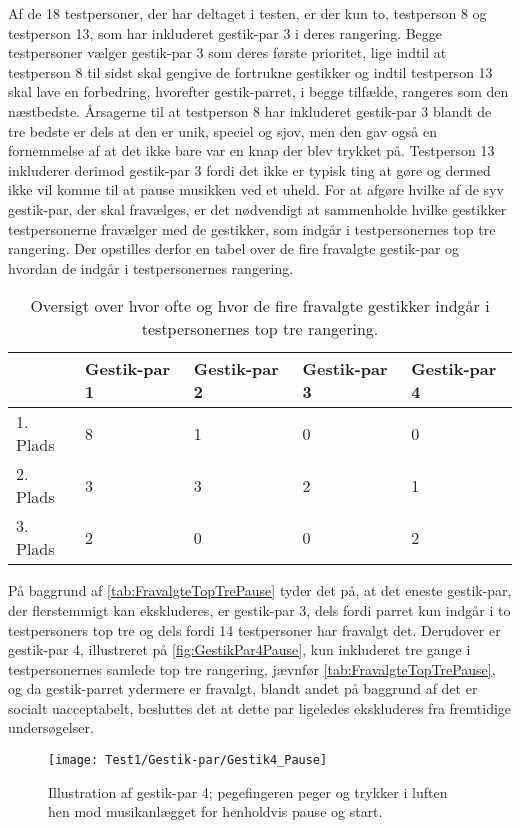 Af de 18 testpersoner, der har deltaget i testen, er der kun to, testperson 8 og testperson 13, som har inkluderet gestik-par 3 i deres rangering. Begge testpersoner vælger gestik-par 3 som deres første prioritet, lige indtil at testperson 8 til sidst skal gengive de fortrukne gestikker og indtil testperson 13 skal lave en forbedring, hvorefter gestik-parret, i begge tilfælde, rangeres som den næstbedste. Årsagerne til at testperson 8 har inkluderet gestik-par 3 blandt de tre bedste er dels at den er unik, speciel og sjov, men den gav også en fornemmelse af at det ikke bare var en knap der blev trykket på. Testperson 13 inkluderer derimod gestik-par 3 fordi det ikke er typisk ting at gøre og dermed ikke vil komme til at pause musikken ved et uheld.\blankline
%
For at afgøre hvilke af de syv gestik-par, der skal fravælges, er det nødvendigt at sammenholde hvilke gestikker testpersonerne fravælger med de gestikker, som indgår i testpersonernes top tre rangering. Der opstilles derfor en tabel over de fire fravalgte gestik-par og hvordan de indgår i testpersonernes rangering.
%
\begin{table}[H]
	\centering
	\begin{tabular}{ | p{2.4cm} | p{2.4cm} | p{2.4cm} | p{2.4cm} | p{2.4cm} |}
	\hline
		 & Gestik-par 1 & Gestik-par 2 & Gestik-par 3 & Gestik-par 4 \\ \hline
		1. Plads & 8 & 1 & 0 & 0\\ \hline
		2. Plads & 3 & 3 & 2 & 1\\ \hline
		3. Plads & 2 & 0 & 0 & 2\\ \hline
	\end{tabular}
	\caption{Oversigt over hvor ofte og hvor de fire fravalgte gestikker indgår i testpersonernes top tre rangering.}
	\label{tab:FravalgteTopTrePause}
\end{table}
\noindent
%
På baggrund af \autoref{tab:FravalgteTopTrePause} tyder det på, at det eneste gestik-par, der flerstemmigt kan ekskluderes, er gestik-par 3, dels fordi parret kun indgår i to testpersoners top tre og dels fordi 14 testpersoner har fravalgt det. Derudover er gestik-par 4, illustreret på \autoref{fig:GestikPar4Pause}, kun inkluderet tre gange i testpersonernes samlede top tre rangering, jævnfør \autoref{tab:FravalgteTopTrePause}, og da gestik-parret ydermere er fravalgt, blandt andet på baggrund af det er socialt uacceptabelt, besluttes det at dette par ligeledes ekskluderes fra fremtidige undersøgelser.  
%
\begin{figure}[H]
	\centering
	\texttt{[image: Test1/Gestik-par/Gestik4\_Pause]}
	\caption{Illustration af gestik-par 4; pegefingeren peger og trykker i luften hen mod musikanlægget for henholdvis pause og start.}
	\label{fig:GestikPar4Pause}
\end{figure}
